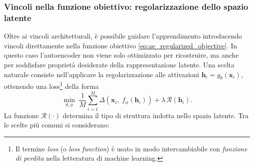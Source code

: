 \subsubsection{Vincoli nella funzione obiettivo: regolarizzazione dello spazio latente}
\label{subsubsec:latent_regularization}

Oltre ai vincoli architetturali, è possibile guidare l'apprendimento introducendo
vincoli direttamente nella funzione obiettivo \eqref{eq:ae_regularized_objective}.
In questo caso l'autoencoder non viene solo ottimizzato per ricostruire, ma anche
per soddisfare proprietà desiderate della rappresentazione latente. Una scelta
naturale consiste nell'applicare la regolarizzazione alle attivazioni
$\mathbf{h}_i = g_\theta(\mathbf{x}_i)$, ottenendo una 
loss\footnote{Il termine \textit{loss} (o \textit{loss function}) è usato in modo intercambiabile con \textit{funzione di perdita} nella letteratura di machine learning.} della forma
\begin{equation}
    \min_{\theta,\phi}\;
    \frac{1}{M}\sum_{i=1}^{M}
    \Delta\!\left(\mathbf{x}_i,\; f_\phi(\mathbf{h}_i)\right)
    + \lambda\,\mathcal{R}\!\left(\mathbf{h}_i\right).
    \label{eq:ae_latent_regularized_objective}
\end{equation}
La funzione $\mathcal{R}(\cdot)$ determina il tipo di struttura indotta nello
spazio latente. Tra le scelte più comuni si considerano:

